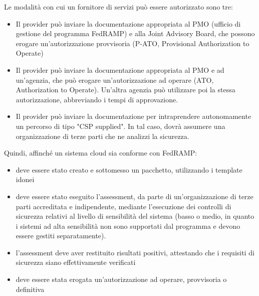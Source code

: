 \documentclass[../main.tex]{subfiles}
\begin{document}
Le modalità con cui un fornitore di servizi può essere autorizzato sono tre:
\begin{itemize}
    \item Il provider può inviare la documentazione appropriata al PMO (ufficio di gestione del programma FedRAMP) e alla Joint Advisory Board, che possono erogare un'autorizzazione provvisoria (P-ATO, Provisional Authorization to Operate) 
    \item Il provider può inviare la documentazione appropriata al PMO e ad un'agenzia, che può erogare un'autorizzazione ad operare (ATO, Authorization to Operate). Un'altra agenzia può utilizzare poi la stessa autorizzazione, abbreviando i tempi di approvazione.
    \item Il provider può inviare la documentazione per intraprendere autonomamente un percorso di tipo "CSP supplied". In tal caso, dovrà assumere una organizzazione di terze parti che ne analizzi la sicurezza.
\end{itemize}

Quindi, affinché un sistema cloud sia conforme con FedRAMP:
\begin{itemize}
    \item deve essere stato creato e sottomesso un pacchetto, utilizzando i template idonei
    \item deve essere stato eseguito l'assessment, da parte di un'organizzazione di terze parti accreditata e indipendente, mediante l'esecuzione dei controlli di sicurezza relativi al livello di sensibilità del sistema (basso o medio, in quanto i sistemi ad alta sensibilità non sono supportati dal programma e devono essere gestiti separatamente).
    \item l'assessment deve aver restituito risultati positivi, attestando che i requisiti di sicurezza siano effettivamente verificati
    \item deve essere stata erogata un'autorizzazione ad operare, provvisoria o definitiva
\end{itemize}
\end{document}
